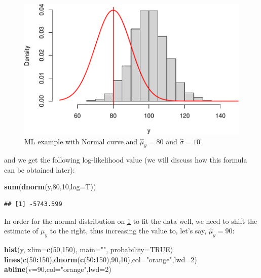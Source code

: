 \documentclass[
]{book}
\newenvironment{Shaded}{\begin{snugshade}}{\end{snugshade}}
\newcommand{\AttributeTok}[1]{\textcolor[rgb]{0.13,0.29,0.53}{#1}}
\newcommand{\ConstantTok}[1]{\textcolor[rgb]{0.56,0.35,0.01}{#1}}
\newcommand{\DecValTok}[1]{\textcolor[rgb]{0.00,0.00,0.81}{#1}}
\newcommand{\FunctionTok}[1]{\textcolor[rgb]{0.13,0.29,0.53}{\textbf{#1}}}
\newcommand{\NormalTok}[1]{#1}
\newcommand{\SpecialCharTok}[1]{\textcolor[rgb]{0.81,0.36,0.00}{\textbf{#1}}}
\newcommand{\StringTok}[1]{\textcolor[rgb]{0.31,0.60,0.02}{#1}}
\theoremstyle{definition}
\theoremstyle{definition}
\theoremstyle{definition}
\theoremstyle{definition}
\theoremstyle{remark}
\begin{document}
\begin{figure}
\centering
\includegraphics{Svetunkov---Statistics-for-Business-Analytics_files/figure-latex/MLENormalExample01-1.pdf}
\caption{\label{fig:MLENormalExample01}ML example with Normal curve and \(\hat{\mu}_y=80\) and \(\hat{\sigma}=10\)}
\end{figure}

and we get the following log-likelihood value (we will discuss how this formula can be obtained later):

\begin{Shaded}
\begin{Highlighting}[]
\FunctionTok{sum}\NormalTok{(}\FunctionTok{dnorm}\NormalTok{(y,}\DecValTok{80}\NormalTok{,}\DecValTok{10}\NormalTok{,}\AttributeTok{log=}\NormalTok{T))}
\end{Highlighting}
\end{Shaded}

\begin{verbatim}
## [1] -5743.599
\end{verbatim}

In order for the normal distribution on \ref{fig:MLENormalExample01} to fit the data well, we need to shift the estimate of \(\mu_y\) to the right, thus increasing the value to, let's say, \(\hat{\mu}_y=90\):

\begin{Shaded}
\begin{Highlighting}[]
\FunctionTok{hist}\NormalTok{(y, }\AttributeTok{xlim=}\FunctionTok{c}\NormalTok{(}\DecValTok{50}\NormalTok{,}\DecValTok{150}\NormalTok{), }\AttributeTok{main=}\StringTok{""}\NormalTok{, }\AttributeTok{probability=}\ConstantTok{TRUE}\NormalTok{)}
\FunctionTok{lines}\NormalTok{(}\FunctionTok{c}\NormalTok{(}\DecValTok{50}\SpecialCharTok{:}\DecValTok{150}\NormalTok{),}\FunctionTok{dnorm}\NormalTok{(}\FunctionTok{c}\NormalTok{(}\DecValTok{50}\SpecialCharTok{:}\DecValTok{150}\NormalTok{),}\DecValTok{90}\NormalTok{,}\DecValTok{10}\NormalTok{),}\AttributeTok{col=}\StringTok{"orange"}\NormalTok{,}\AttributeTok{lwd=}\DecValTok{2}\NormalTok{)}
\FunctionTok{abline}\NormalTok{(}\AttributeTok{v=}\DecValTok{90}\NormalTok{,}\AttributeTok{col=}\StringTok{"orange"}\NormalTok{,}\AttributeTok{lwd=}\DecValTok{2}\NormalTok{)}
\end{Highlighting}
\end{Shaded}
\end{document}
